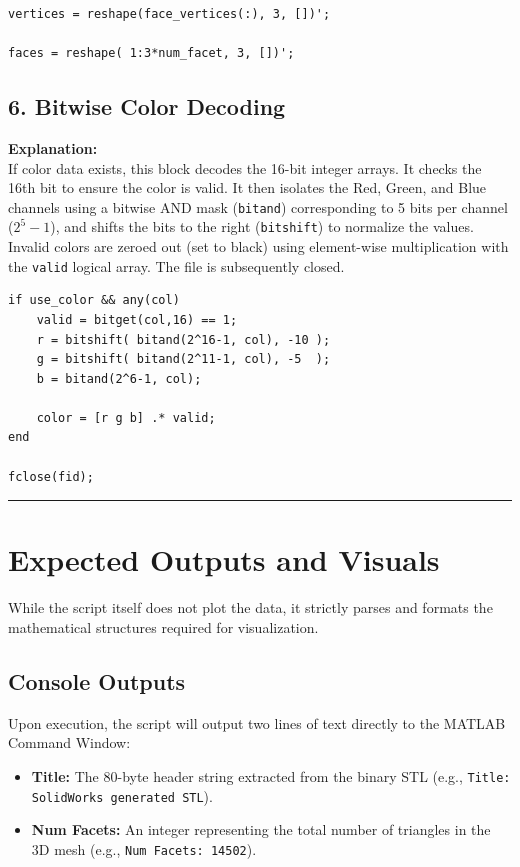 \begin{lstlisting}
vertices = reshape(face_vertices(:), 3, [])';

faces = reshape( 1:3*num_facet, 3, [])';
\end{lstlisting}


\subsection{6. Bitwise Color Decoding}
\textbf{Explanation:} \\
If color data exists, this block decodes the 16-bit integer arrays. It checks the 16th bit to ensure the color is valid. It then isolates the Red, Green, and Blue channels using a bitwise AND mask (\texttt{bitand}) corresponding to 5 bits per channel ($2^5-1$), and shifts the bits to the right (\texttt{bitshift}) to normalize the values. Invalid colors are zeroed out (set to black) using element-wise multiplication with the \texttt{valid} logical array. The file is subsequently closed.

\begin{lstlisting}
if use_color && any(col)
	valid = bitget(col,16) == 1;
	r = bitshift( bitand(2^16-1, col), -10 );
	g = bitshift( bitand(2^11-1, col), -5  );
	b = bitand(2^6-1, col);

	color = [r g b] .* valid;
end

fclose(fid);
\end{lstlisting}

\vspace{0.5cm}
\hrule
\vspace{0.5cm}

\section{Expected Outputs and Visuals}

While the script itself does not plot the data, it strictly parses and formats the mathematical structures required for visualization. 

\subsection*{Console Outputs}
Upon execution, the script will output two lines of text directly to the MATLAB Command Window:
\begin{itemize}
    \item \textbf{Title:} The 80-byte header string extracted from the binary STL (e.g., \texttt{Title: SolidWorks generated STL}).
    \item \textbf{Num Facets:} An integer representing the total number of triangles in the 3D mesh (e.g., \texttt{Num Facets: 14502}).
\end{itemize}

